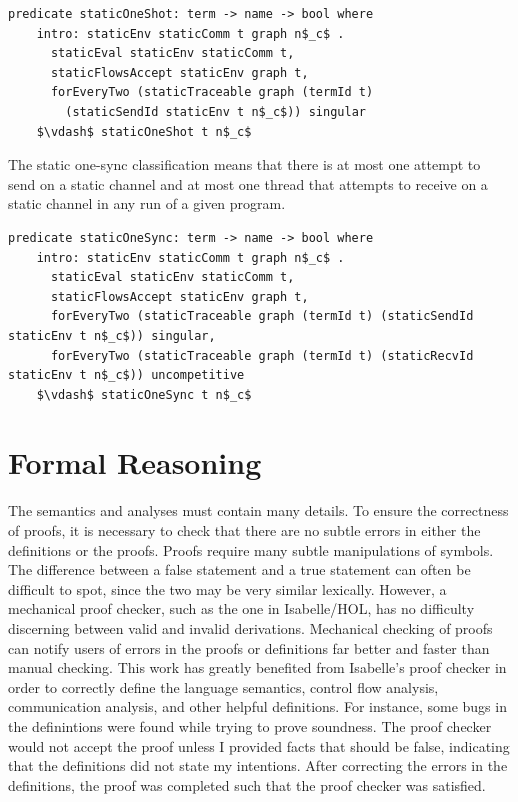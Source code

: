 \documentclass[letterpaper, 11pt]{report}
\begin{document}
\begin{lstlisting}[language=logic, mathescape]
  predicate staticOneShot: term -> name -> bool where
    intro: staticEnv staticComm t graph n$_c$ .
      staticEval staticEnv staticComm t,
      staticFlowsAccept staticEnv graph t,
      forEveryTwo (staticTraceable graph (termId t)
        (staticSendId staticEnv t n$_c$)) singular
    $\vdash$ staticOneShot t n$_c$
\end{lstlisting}

The static one-sync classification means that there is at most one attempt to send on a
static channel and at most one
thread that attempts to receive on a static channel in any run of a given program.

\begin{lstlisting}[language=logic, mathescape]
  predicate staticOneSync: term -> name -> bool where
    intro: staticEnv staticComm t graph n$_c$ .
      staticEval staticEnv staticComm t,
      staticFlowsAccept staticEnv graph t,
      forEveryTwo (staticTraceable graph (termId t) (staticSendId staticEnv t n$_c$)) singular,
      forEveryTwo (staticTraceable graph (termId t) (staticRecvId staticEnv t n$_c$)) uncompetitive
    $\vdash$ staticOneSync t n$_c$
\end{lstlisting}



\section{Formal Reasoning}
The semantics and analyses must contain many details. To ensure the
correctness of proofs, it is necessary to check that there are no subtle errors in either the 
definitions or the proofs. Proofs require many subtle manipulations of symbols. The
difference between a false statement and a true statement can often be difficult to spot, since
the two may be very similar lexically. However, a mechanical proof checker, such as the one in
Isabelle/HOL, has no difficulty discerning between valid and invalid derivations.
Mechanical checking of proofs can notify users of errors in the proofs or definitions far better
and faster than manual checking. This work has greatly benefited from Isabelle's proof checker in
order to correctly define the language semantics, control flow analysis, communication analysis,
and other helpful definitions. For instance, some bugs in the
definintions were found while trying to prove soundness.
The proof checker would not accept the proof unless I provided facts that
should be false, indicating that the definitions did not state my intentions.
After correcting the errors in the definitions, the proof was completed such that the proof
checker was satisfied.
\end{document}
